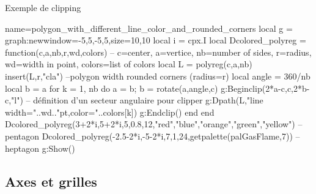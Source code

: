 \begin{demo}{Exemple de clipping}
\begin{luadraw}{name=polygon_with_different_line_color_and_rounded_corners}
local g = graph:new{window={-5,5,-5,5},size={10,10}}
local i = cpx.I
local Dcolored_polyreg = function(c,a,nb,r,wd,colors) 
-- c=center, a=vertice, nb=number of sides, r=radius, wd=width in point, colors=list of colors
    local L = polyreg(c,a,nb)
    insert(L,{r,"cla"}) --polygon width rounded corners (radius=r)
    local angle = 360/nb
    local b = a
    for k = 1, nb do
        a = b; b = rotate(a,angle,c)
        g:Beginclip({2*a-c,c,2*b-c,"l"})  -- définition d'un secteur angulaire pour clipper
        g:Dpath(L,"line width="..wd.."pt,color="..colors[k])
        g:Endclip()
    end
end
Dcolored_polyreg(3+2*i,5+2*i,5,0.8,12,{"red","blue","orange","green","yellow"}) -- pentagon
Dcolored_polyreg(-2.5-2*i,-5-2*i,7,1,24,getpalette(palGasFlame,7))  -- heptagon
g:Show()
\end{luadraw}
\end{demo}


\subsection{Axes et grilles}

